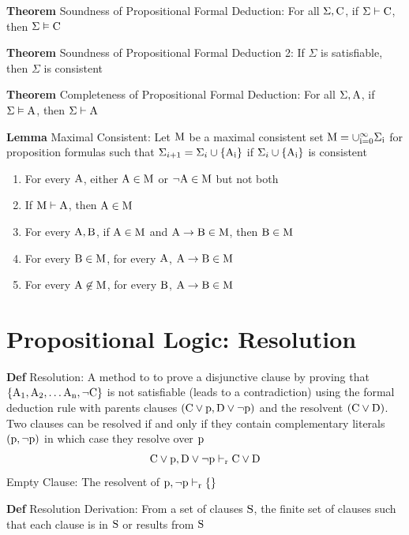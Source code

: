 \documentclass[11pt,notitlepage]{report}
\newcommand{\tbf}[1]{\textbf{#1}}
\begin{document}
\tbf{Theorem} Soundness of Propositional Formal Deduction: For all $\Sigma, \rm C$, if $\Sigma \vdash \rm C$, then $\Sigma \vDash \rm C$ 

\tbf{Theorem} Soundness of Propositional Formal Deduction 2: If $\Sigma$ is satisfiable, then $\Sigma$ is consistent

\tbf{Theorem} Completeness of Propositional Formal Deduction: For all $\Sigma, \rm A$, if $\Sigma \vDash \rm A$, then $\Sigma \vdash \rm A$ 

\tbf{Lemma} Maximal Consistent: Let $\rm M$ be a maximal consistent set $\rm M = \cup_{i=0}^\infty \Sigma_i$ for proposition formulas such that $\Sigma_{i+1} = \Sigma_i \cup \{\rm A_i\}$ if $\Sigma_i \cup \{\rm A_i\}$ is consistent
\begin{enumerate}[label=MC\arabic*:]
    \item For every $\rm A$, either $\rm A \in \rm M$ or $\neg \rm A \in \rm M$ but not both
    \item If $\rm M \vdash \rm A$, then $\rm A \in \rm M$
    \item For every $\rm A, \rm B$, if $\rm A \in \rm M$ and $\rm A \to \rm B \in \rm M$, then $\rm B \in \rm M$
    \item For every $\rm B \in \rm M$, for every $\rm A$, $\rm A \to \rm B \in \rm M$
    \item For every $\rm A \not\in \rm M$, for every $\rm B$, $\rm A \to \rm B \in \rm M$
\end{enumerate}

\newpage
\section{Propositional Logic: Resolution}

\tbf{Def} Resolution: A method to to prove a disjunctive clause by proving that $\{\rm A_1, A_2, \dots A_n, \neg C\}$ is not satisfiable (leads to  a contradiction) using the formal deduction rule with parents clauses $(\rm C \vee p, \rm D \vee \neg p)$ and the resolvent $(\rm C \vee D)$. Two clauses can be resolved if and only if they contain complementary literals $(\rm p, \neg \rm p)$ in which case they resolve over $\rm p$
$$\rm C \vee p, \rm D \vee \neg p \vdash_r C \vee D$$
\hspace*{5mm} Empty Clause: The resolvent of $\rm p, \neg p \vdash_r \{\}$

\tbf{Def} Resolution Derivation: From a set of clauses $\rm S$, the finite set of clauses such that each clause is in $\rm S$ or results from $\rm S$
\end{document}
